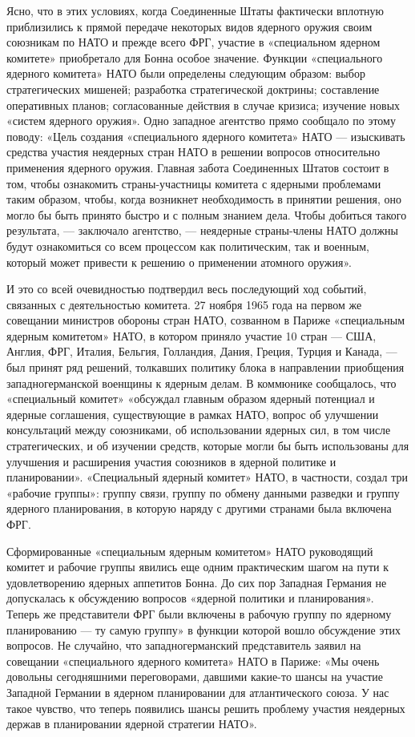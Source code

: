 \documentclass[12pt, a4paper, openany]{book}
\begin{document}
	Ясно, что в этих условиях, когда Соединенные Штаты фактически вплотную приблизились к прямой передаче некоторых видов ядерного оружия своим союзникам по НАТО и прежде всего ФРГ, участие в «специальном ядерном комитете» приобретало для Бонна особое значение. Функции «специального ядерного комитета» НАТО были определены следующим образом: выбор стратегических мишеней; разработка стратегической доктрины; составление оперативных планов; согласованные действия в случае кризиса; изучение новых «систем ядерного оружия». Одно западное агентство прямо сообщало по этому поводу: «Цель создания «специального ядерного комитета» НАТО — изыскивать средства участия неядерных стран НАТО в решении вопросов относительно применения ядерного оружия. Главная забота Соединенных Штатов состоит в том, чтобы ознакомить страны-участницы комитета с ядерными проблемами таким образом, чтобы, когда возникнет необходимость в принятии решения, оно могло бы быть принято быстро и с полным знанием дела. Чтобы добиться такого результата, — заключало агентство, — неядерные страны-члены НАТО должны будут ознакомиться со всем процессом как политическим, так и военным, который может привести к решению о применении атомного оружия».
	
	И это со всей очевидностью подтвердил весь последующий ход событий, связанных с деятельностью комитета. 27 ноября 1965 года на первом же совещании министров обороны стран НАТО, созванном в Париже «специальным ядерным комитетом» НАТО, в котором приняло участие 10 стран — США, Англия, ФРГ, Италия, Бельгия, Голландия, Дания, Греция, Турция и Канада, — был принят ряд решений, толкавших политику блока в направлении приобщения западногерманской военщины к ядерным делам. В коммюнике сообщалось, что «специальный комитет» «обсуждал главным образом ядерный потенциал и ядерные соглашения, существующие в рамках НАТО, вопрос об улучшении консультаций между союзниками, об использовании ядерных сил, в том числе стратегических, и об изучении средств, которые могли бы быть использованы для улучшения и расширения участия союзников в ядерной политике и планировании». «Специальный ядерный комитет» НАТО, в частности, создал три «рабочие группы»: группу связи, группу по обмену данными разведки и группу ядерного планирования, в которую наряду с другими странами была включена ФРГ.
	
	Сформированные «специальным ядерным комитетом» НАТО руководящий комитет и рабочие группы явились еще одним практическим шагом на пути к удовлетворению ядерных аппетитов Бонна. До сих пор Западная Германия не допускалась к обсуждению вопросов «ядерной политики и планирования». Теперь же представители ФРГ были включены в рабочую группу по ядерному планированию — ту самую группу» в функции которой вошло обсуждение этих вопросов. Не случайно, что западногерманский представитель заявил на совещании «специального ядерного комитета» НАТО в Париже: «Мы очень довольны сегодняшними переговорами, давшими какие-то шансы на участие Западной Германии в ядерном планировании для атлантического союза. У нас такое чувство, что теперь появились шансы решить проблему участия неядерных держав в планировании ядерной стратегии НАТО».
	
\end{document}
